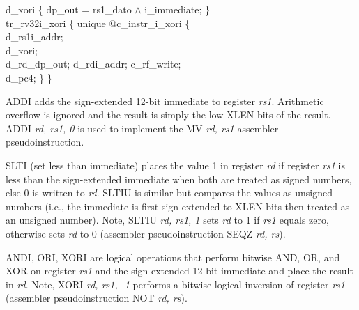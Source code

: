 {%
\indent d\_xori \{ dp\_out = rs1\_dato $\wedge$ i\_immediate; \}\\%
\indent tr\_rv32i\_xori \{ unique @c\_instr\_i\_xori \{ \\%
\indent \hspace{\parindent} d\_rs1i\_addr; \\%
\indent \hspace{\parindent} d\_xori; \\%
\indent \hspace{\parindent} d\_rd\_dp\_out; d\_rdi\_addr; c\_rf\_write;  \\%
\indent \hspace{\parindent} d\_pc4; \} \} \\%
}

ADDI adds the sign-extended 12-bit immediate to register {\em rs1}.
Arithmetic overflow is ignored and the result is simply the low
XLEN bits of the result.  ADDI {\em rd, rs1, 0} is used to implement the
MV {\em rd, rs1} assembler pseudoinstruction.

SLTI (set less than immediate) places the value 1 in register {\em rd}
if register {\em rs1} is less than the sign-extended immediate when
both are treated as signed numbers, else 0 is written to {\em rd}.
SLTIU is similar but compares the values as unsigned numbers (i.e.,
the immediate is first sign-extended to XLEN bits then treated as an
unsigned number).  Note, SLTIU {\em rd, rs1, 1} sets {\em rd}
to 1 if {\em rs1} equals zero, otherwise sets {\em rd} to 0 (assembler
pseudoinstruction SEQZ {\em rd, rs}).

ANDI, ORI, XORI are logical operations that perform bitwise AND, OR,
and XOR on register {\em rs1} and the sign-extended 12-bit immediate
and place the result in {\em rd}.  Note, XORI {\em rd, rs1, -1}
performs a bitwise logical inversion of register {\em rs1} (assembler
pseudoinstruction NOT {\em rd, rs}).

